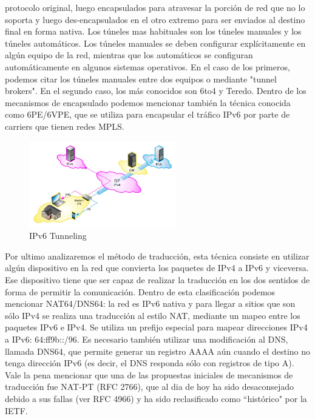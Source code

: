 \documentclass[11pt,a4paper]{article}
\begin{document}
protocolo original, luego encapsulados para atravesar la porción de red que no lo soporta y luego 
des-encapsulados en el otro extremo para ser enviados al destino final en forma nativa.
Los túneles mas habituales son los túneles manuales y los túneles automáticos. Los túneles manuales 
se deben configurar explícitamente en algún equipo de la red, mientras que los automáticos se 
configuran automáticamente en algunos sistemas operativos. En el caso de los primeros, podemos citar 
los túneles manuales entre dos equipos o mediante "tunnel brokers". En el segundo caso, los más 
conocidos son 6to4 y Teredo.
Dentro de los mecanismos de encapsulado podemos mencionar también la técnica conocida como 6PE/6VPE, 
que se utiliza para encapsular el tráfico IPv6 por parte de carriers que tienen redes MPLS.
\begin{figure}[h!]
 \centering
 \includegraphics[width=0.57\textwidth]{ipv6_tunnel.jpg}
 \caption[IPv6 Tunneling]{IPv6 Tunneling}
\end{figure}\par
Por ultimo analizaremos el método de traducción, esta técnica consiste en utilizar algún dispositivo 
en la red que convierta los paquetes de IPv4 a IPv6 y viceversa. Ese dispositivo tiene que ser capaz 
de realizar la traducción en los dos sentidos de forma de permitir la comunicación. Dentro de esta 
clasificación podemos mencionar NAT64/DNS64: la red es IPv6 nativa y para llegar a sitios que son 
sólo IPv4 se realiza una traducción al estilo NAT, mediante un mapeo entre los paquetes IPv6 e IPv4. 
Se utiliza un prefijo especial para mapear direcciones IPv4 a IPv6: 64:ff9b::/96. Es necesario 
también utilizar una modificación al DNS, llamada DNS64, que permite generar un registro AAAA aún 
cuando el destino no tenga dirección IPv6 (es decir, el DNS responda sólo con registros de tipo A). 
Vale la pena mencionar que una de las propuestas iniciales de mecanismos de traducción fue NAT-PT 
(RFC 2766), que al dia de hoy ha sido desaconsejado debido a sus fallas (ver RFC 4966) y ha sido 
reclasificado como ``histórico" por la IETF.
\end{document}
